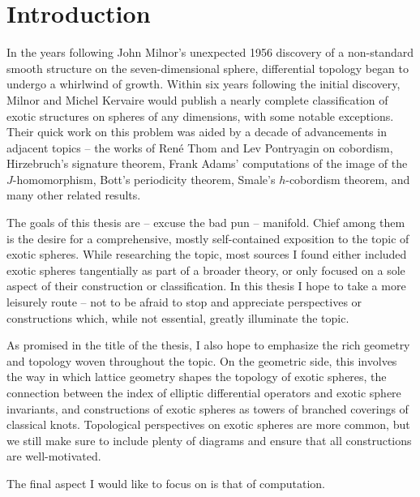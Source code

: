 \chapter{Introduction}\label{chap:introduction}

\begin{epigraph}{10em}{}
\end{epigraph}

In the years following John Milnor's unexpected 1956 discovery of a non-standard smooth structure on the seven-dimensional sphere, differential topology began to undergo a whirlwind of growth. Within six years following the initial discovery, Milnor and Michel Kervaire would publish a nearly complete classification of exotic structures on spheres of any dimensions, with some notable exceptions. 
Their quick work on this problem was aided by a decade of advancements in adjacent topics -- the works of Ren\'e Thom and Lev Pontryagin on cobordism, Hirzebruch's signature theorem, Frank Adams' computations of the image of the $J$-homomorphism, Bott's periodicity theorem, Smale's $h$-cobordism theorem, and many other related results. 


The goals of this thesis are -- excuse the bad pun -- manifold. Chief among them is the desire for a comprehensive, mostly self-contained exposition to the topic of exotic spheres. While researching the topic, most sources I found either included exotic spheres tangentially as part of a broader theory, or only focused on a sole aspect of their construction or classification.
In this thesis I hope to take a more leisurely route -- not to be afraid to stop and appreciate perspectives or constructions which, while not essential, greatly illuminate the topic.
\medskip

As promised in the title of the thesis, I also hope to emphasize the rich geometry and topology woven throughout the topic. On the geometric side, this involves the way in which lattice geometry shapes the topology of exotic spheres, the connection between the index of elliptic differential operators and exotic sphere invariants, and constructions of exotic spheres as towers of branched coverings of classical knots. Topological perspectives on exotic spheres are more common, but we still make sure to include plenty of diagrams and ensure that all constructions are well-motivated.

The final aspect I would like to focus on is that of computation. 
